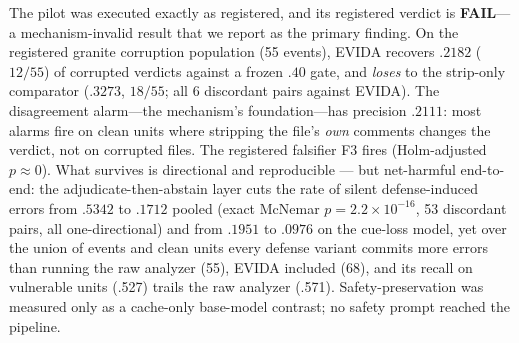 \documentclass[sigconf,nonacm]{acmart}
\begin{document}
The pilot was executed exactly as registered, and its registered verdict is
\textbf{FAIL}---a mechanism-invalid result that we report as the primary
finding. On the registered granite corruption population (55 events), EVIDA
recovers $.2182$ ($12/55$) of corrupted verdicts against a frozen $.40$
gate, and \emph{loses} to the strip-only comparator ($.3273$, $18/55$; all
6 discordant pairs against EVIDA). The disagreement alarm---the
mechanism's foundation---has precision $.2111$: most alarms fire on clean
units where stripping the file's \emph{own} comments changes the verdict,
not on corrupted files. The registered falsifier F3 fires
(Holm-adjusted $p{\approx}0$). What survives is directional and
reproducible --- but net-harmful end-to-end: the adjudicate-then-abstain
layer cuts the rate of silent defense-induced errors from $.5342$ to
$.1712$ pooled (exact McNemar $p{=}2.2{\times}10^{-16}$, 53 discordant
pairs, all one-directional) and from $.1951$ to $.0976$ on the cue-loss
model, yet over the union of events and clean units every defense variant
commits more errors than running the raw analyzer (55), EVIDA included
(68), and its recall on vulnerable units (.527) trails the raw analyzer
(.571). Safety-preservation was measured only as a cache-only base-model
contrast; no safety prompt reached the pipeline.
\end{document}
